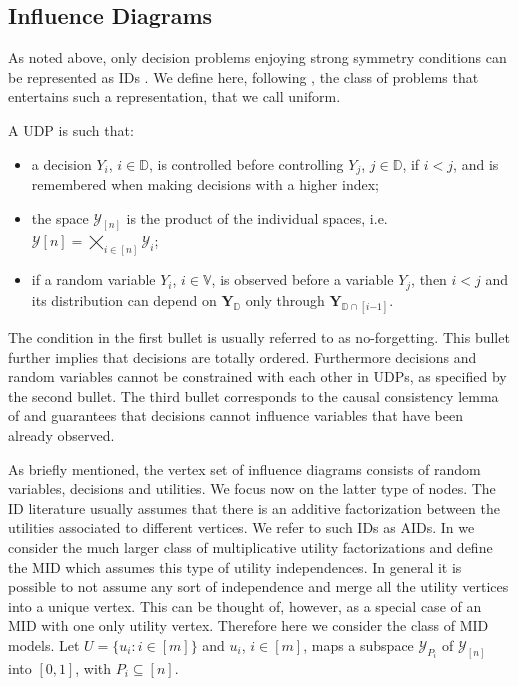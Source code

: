 \subsection{Influence Diagrams}
\label{sec:id}
As noted above, only decision problems enjoying strong symmetry conditions can be represented as \glspl{ID} \citep{Howard2005, Jensen2009,Smith2010}. We define here, following \citep{Smith2010}, the class of problems that entertains such a representation, that we call uniform.
\begin{definition}
\label{def:udp}
A \gls{UDP} is such that:
\begin{itemize}
\item a decision $Y_i$, $i\in \mathbb{D}$, is controlled before controlling $Y_j$, $j\in \mathbb{D}$, if $i<j$, and is remembered when making decisions with a higher index;
\item the space $\bm{\mathcal{Y}}_{[n]}$ is the product of the individual spaces, i.e. $\bm{\mathcal{Y}}[n]=\bigtimes_{i\in[n]}\mathcal{Y}_i$;
\item if a random variable $Y_i$, $i\in\mathbb{V}$, is observed before a variable $Y_j$, then $i<j$ and its distribution can depend  on $\bm{Y}_\mathbb{D}$ only through $\bm{Y}_{\mathbb{D}\cap[i{-1}]}$.
\end{itemize}
\end{definition}
The condition in the first bullet is usually referred to as no-forgetting. This bullet further implies that decisions are totally ordered. Furthermore decisions and random variables cannot be constrained with each other in \glspl{UDP}, as specified by the second bullet. The third bullet corresponds to the causal consistency lemma of \citet{Cowell1999a} and guarantees that decisions cannot influence variables that have been already observed.

As briefly mentioned, the vertex set of influence diagrams consists of random variables, decisions and utilities. We focus now on the latter type of nodes. The \gls{ID} literature usually assumes that there is an additive factorization between the utilities associated to different vertices. We refer to such \glspl{ID} as \glspl{AID}. In \citet{Leonelli2015a} we consider the much larger class of multiplicative utility factorizations and define the \gls{MID} which assumes this type of utility independences. In general it is possible to not assume any sort of independence and merge all the utility vertices into a unique vertex. This can be thought of, however, as a special case of an \gls{MID} with one only utility vertex. Therefore here we consider the class of \gls{MID} models. Let $U=\{u_i:i\in[m]\}$ and $u_i$, $i\in[m]$, maps a subspace $\bm{\mathcal{Y}}_{P_i}$ of $\bm{\mathcal{Y}}_{[n]}$ into $[0,1]$, with $P_i\subseteq [n]$.

